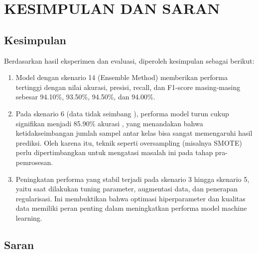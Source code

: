 \chapter{KESIMPULAN DAN SARAN}

\section{Kesimpulan}

\par Berdasarkan hasil eksperimen dan evaluasi, diperoleh kesimpulan sebagai berikut:
\begin{enumerate}
    \item Model dengan skenario 14 (Ensemble Method) memberikan performa tertinggi dengan nilai akurasi, presisi, recall, dan F1-score masing-masing sebesar 94.10\%, 93.50\%, 94.50\%, dan 94.00\%. 

    \item Pada skenario 6 (data tidak seimbang ), performa model turun cukup signifikan menjadi 85.90\% akurasi , yang menandakan bahwa ketidakseimbangan jumlah sampel antar kelas bisa sangat memengaruhi hasil prediksi. Oleh karena itu, teknik seperti oversampling (misalnya SMOTE) perlu dipertimbangkan untuk mengatasi masalah ini pada tahap pra-pemrosesan.

    \item Peningkatan performa yang stabil terjadi pada skenario 3 hingga skenario 5, yaitu saat dilakukan tuning parameter, augmentasi data, dan penerapan regularisasi. Ini membuktikan bahwa optimasi hiperparameter dan kualitas data memiliki peran penting dalam meningkatkan performa model machine learning.
\end{enumerate}

\section{Saran}

